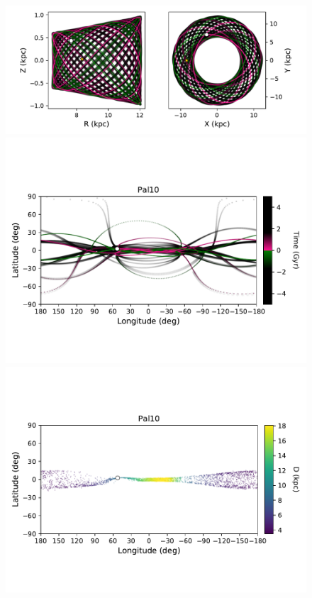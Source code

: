             \begin{figure}
                \includegraphics[clip=true, trim = 0mm 2mm 0mm 0mm, width=0.9\columnwidth]{images/PII_individual_Pal10_Pal10orbitRZXY.pdf}

                \includegraphics[clip=true, trim = 0mm 20mm 0mm 10mm, width=0.9\columnwidth]{images/PII_individual_Pal10_Pal10orbit.pdf}

                \includegraphics[clip=true, trim = 0mm 20mm 0mm 10mm, width=0.9\columnwidth]{images/PII_individual_Pal10_Pal10_LB_D.pdf}


\end{figure}
